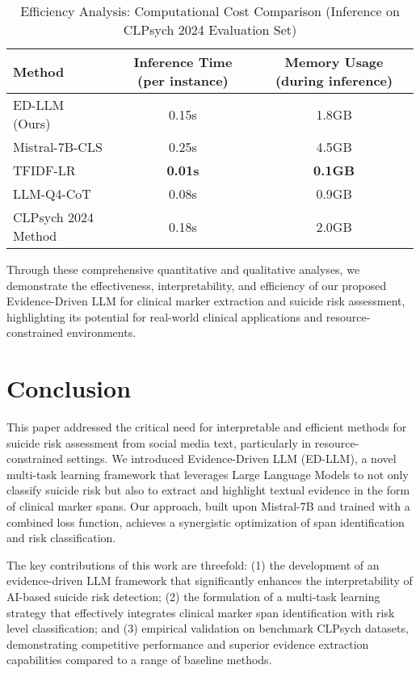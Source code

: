 \begin{table*}[t]
    \centering
    \caption{Efficiency Analysis: Computational Cost Comparison (Inference on CLPsych 2024 Evaluation Set)}
    \label{tab:efficiency_results}
    \begin{tabular}{lcc}
        \toprule
        \textbf{Method} & \textbf{Inference Time (per instance)} & \textbf{Memory Usage (during inference)} \\
        \midrule
        ED-LLM (Ours) & 0.15s & 1.8GB \\
        Mistral-7B-CLS & 0.25s & 4.5GB \\
        TFIDF-LR & \textbf{0.01s} & \textbf{0.1GB} \\
        LLM-Q4-CoT & 0.08s & 0.9GB \\
        CLPsych 2024 Method & 0.18s & 2.0GB \\
        \bottomrule
    \end{tabular}
\end{table*}

Through these comprehensive quantitative and qualitative analyses, we demonstrate the effectiveness, interpretability, and efficiency of our proposed Evidence-Driven LLM for clinical marker extraction and suicide risk assessment, highlighting its potential for real-world clinical applications and resource-constrained environments.




\section{Conclusion}

This paper addressed the critical need for interpretable and efficient methods for suicide risk assessment from social media text, particularly in resource-constrained settings. We introduced Evidence-Driven LLM (ED-LLM), a novel multi-task learning framework that leverages Large Language Models to not only classify suicide risk but also to extract and highlight textual evidence in the form of clinical marker spans.  Our approach, built upon Mistral-7B and trained with a combined loss function, achieves a synergistic optimization of span identification and risk classification.

The key contributions of this work are threefold: (1) the development of an evidence-driven LLM framework that significantly enhances the interpretability of AI-based suicide risk detection; (2) the formulation of a multi-task learning strategy that effectively integrates clinical marker span identification with risk level classification; and (3) empirical validation on benchmark CLPsych datasets, demonstrating competitive performance and superior evidence extraction capabilities compared to a range of baseline methods.


